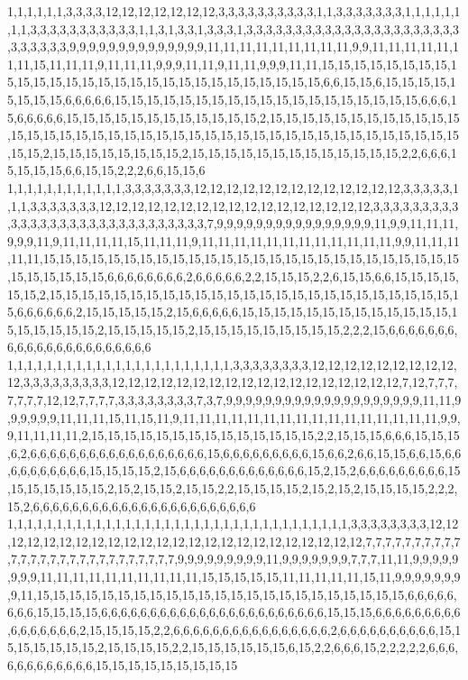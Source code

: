 1,1,1,1,1,1,3,3,3,3,12,12,12,12,12,12,12,3,3,3,3,3,3,3,3,3,3,1,1,3,3,3,3,3,3,3,1,1,1,1,1,1,1,1,3,3,3,3,3,3,3,3,3,3,3,1,1,3,1,3,3,1,3,3,3,1,3,3,3,3,3,3,3,3,3,3,3,3,3,3,3,3,3,3,3,3,3,3,3,3,3,3,3,3,9,9,9,9,9,9,9,9,9,9,9,9,9,9,11,11,11,11,11,11,11,11,11,9,9,11,11,11,11,11,11,11,15,11,11,11,9,11,11,11,9,9,9,11,11,9,11,11,9,9,9,11,11,15,15,15,15,15,15,15,15,15,15,15,15,15,15,15,15,15,15,15,15,15,15,15,15,15,15,15,15,6,6,15,15,6,15,15,15,15,15,15,15,15,6,6,6,6,6,15,15,15,15,15,15,15,15,15,15,15,15,15,15,15,15,15,15,15,6,6,6,15,6,6,6,6,6,15,15,15,15,15,15,15,15,15,15,15,15,2,15,15,15,15,15,15,15,15,15,15,15,15,15,15,15,15,15,15,15,15,15,15,15,15,15,15,15,15,15,15,15,15,15,15,15,15,15,15,15,15,15,15,2,15,15,15,15,15,15,15,15,2,15,15,15,15,15,15,15,15,15,15,15,15,15,2,2,6,6,6,15,15,15,15,6,6,15,15,2,2,2,6,6,15,15,6
1,1,1,1,1,1,1,1,1,1,1,1,3,3,3,3,3,3,3,12,12,12,12,12,12,12,12,12,12,12,12,12,3,3,3,3,3,1,1,1,3,3,3,3,3,3,3,12,12,12,12,12,12,12,12,12,12,12,12,12,12,12,12,12,3,3,3,3,3,3,3,3,3,3,3,3,3,3,3,3,3,3,3,3,3,3,3,3,3,3,3,3,3,7,9,9,9,9,9,9,9,9,9,9,9,9,9,9,9,9,11,9,9,11,11,11,9,9,9,11,9,11,11,11,11,15,11,11,11,9,11,11,11,11,11,11,11,11,11,11,11,11,9,9,11,11,11,11,11,15,15,15,15,15,15,15,15,15,15,15,15,15,15,15,15,15,15,15,15,15,15,15,15,15,15,15,15,15,15,15,15,6,6,6,6,6,6,6,6,2,6,6,6,6,6,2,2,15,15,15,2,2,6,15,15,6,6,15,15,15,15,15,15,2,15,15,15,15,15,15,15,15,15,15,15,15,15,15,15,15,15,15,15,15,15,15,15,15,15,15,6,6,6,6,6,6,2,15,15,15,15,15,2,15,6,6,6,6,6,15,15,15,15,15,15,15,15,15,15,15,15,15,15,15,15,15,15,15,2,15,15,15,15,15,2,15,15,15,15,15,15,15,15,15,2,2,2,15,6,6,6,6,6,6,6,6,6,6,6,6,6,6,6,6,6,6,6,6,6,6
1,1,1,1,1,1,1,1,1,1,1,1,1,1,1,1,1,1,1,1,1,1,1,3,3,3,3,3,3,3,3,12,12,12,12,12,12,12,12,12,12,3,3,3,3,3,3,3,3,3,12,12,12,12,12,12,12,12,12,12,12,12,12,12,12,12,12,12,7,12,7,7,7,7,7,7,7,12,12,7,7,7,7,3,3,3,3,3,3,3,3,7,3,7,9,9,9,9,9,9,9,9,9,9,9,9,9,9,9,9,9,9,9,9,11,11,9,9,9,9,9,9,11,11,11,15,11,15,11,9,11,11,11,11,11,11,11,11,11,11,11,11,11,11,11,11,9,9,9,11,11,11,11,2,15,15,15,15,15,15,15,15,15,15,15,15,15,15,2,2,15,15,15,6,6,6,15,15,15,6,2,6,6,6,6,6,6,6,6,6,6,6,6,6,6,6,6,6,6,15,6,6,6,6,6,6,6,6,6,15,6,6,2,6,6,15,15,6,6,15,6,6,6,6,6,6,6,6,6,6,15,15,15,15,2,15,6,6,6,6,6,6,6,6,6,6,6,6,6,15,2,15,2,6,6,6,6,6,6,6,6,6,15,15,15,15,15,15,15,2,15,2,15,15,2,15,15,2,2,15,15,15,15,2,15,2,15,2,15,15,15,15,2,2,2,15,2,6,6,6,6,6,6,6,6,6,6,6,6,6,6,6,6,6,6,6,6,6,6,6
1,1,1,1,1,1,1,1,1,1,1,1,1,1,1,1,1,1,1,1,1,1,1,1,1,1,1,1,1,1,1,1,1,1,1,3,3,3,3,3,3,3,3,12,12,12,12,12,12,12,12,12,12,12,12,12,12,12,12,12,12,12,12,12,12,12,12,7,7,7,7,7,7,7,7,7,7,7,7,7,7,7,7,7,7,7,7,7,7,7,7,7,7,7,9,9,9,9,9,9,9,9,9,11,9,9,9,9,9,9,9,7,7,7,11,11,9,9,9,9,9,9,9,9,11,11,11,11,11,11,11,11,11,11,15,15,15,15,15,11,11,11,11,11,15,11,9,9,9,9,9,9,9,9,11,15,15,15,15,15,15,15,15,15,15,15,15,15,15,15,15,15,15,15,15,15,15,15,6,6,6,6,6,6,6,6,15,15,15,15,6,6,6,6,6,6,6,6,6,6,6,6,6,6,6,6,6,6,6,6,6,6,6,15,15,15,6,6,6,6,6,6,6,6,6,6,6,6,6,6,6,6,2,15,15,15,15,2,2,6,6,6,6,6,6,6,6,6,6,6,6,6,6,6,6,2,6,6,6,6,6,6,6,6,6,6,15,15,15,15,15,15,15,2,15,15,15,15,2,2,15,15,15,15,15,15,6,15,2,2,6,6,6,15,2,2,2,2,2,6,6,6,6,6,6,6,6,6,6,6,6,15,15,15,15,15,15,15,15,15
